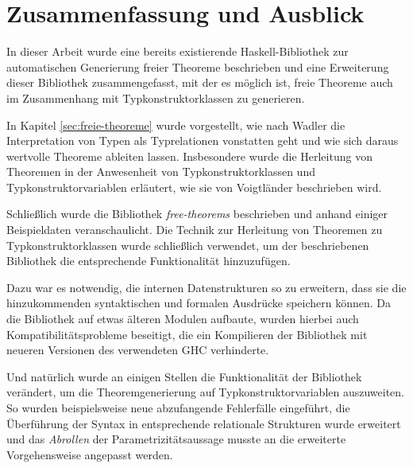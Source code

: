 \section{Zusammenfassung und Ausblick}

In dieser Arbeit wurde eine bereits existierende Haskell-Bibliothek zur automatischen Generierung freier Theoreme
beschrieben und eine Erweiterung dieser Bibliothek zusammengefasst, mit der es möglich ist, freie Theoreme auch im Zusammenhang
mit Typkonstruktorklassen zu generieren.

In Kapitel \ref{sec:freie-theoreme} wurde vorgestellt, wie nach Wadler \cite{wadler} die Interpretation von Typen als Typrelationen
vonstatten geht und wie sich daraus wertvolle Theoreme ableiten lassen. Insbesondere wurde die Herleitung von Theoremen
in der Anwesenheit von Typkonstruktorklassen und Typkonstruktorvariablen erläutert, wie sie von Voigtländer \cite{voigtlander}
beschrieben wird.

Schließlich wurde die Bibliothek \textit{free-theorems} \cite{freetheorems} beschrieben und anhand einiger Beispieldaten
veranschaulicht. Die Technik zur Herleitung von Theoremen zu Typ\-konstruktorklassen wurde schließlich verwendet, um der
beschriebenen Bibliothek die entsprechende Funktionalität hinzuzufügen.

Dazu war es notwendig, die internen Datenstrukturen so zu erweitern, dass sie die hinzukommenden syntaktischen und formalen
Ausdrücke speichern können. Da die Bibliothek auf etwas älteren Modulen aufbaute, wurden hierbei auch
Kompatibilitätsprobleme beseitigt, die ein Kompilieren der Bibliothek mit neueren Versionen des verwendeten GHC verhinderte.


Und natürlich wurde an einigen Stellen die Funktionalität der Bibliothek verändert, um die Theoremgenerierung auf
Typkonstruktorvariablen auszuweiten. So wurden beispielsweise neue abzufangende Fehlerfälle eingeführt, die
Überführung der Syntax in entsprechende relationale Strukturen wurde erweitert und das \textit{Abrollen} der
Parametrizitätsaussage musste an die erweiterte Vorgehensweise angepasst werden.

